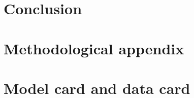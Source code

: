 \documentclass[11pt,a4paper]{article}
\begin{document}
\section{Conclusion}







\appendix
\section{Methodological appendix}

\section{Model card and data card}
\end{document}
